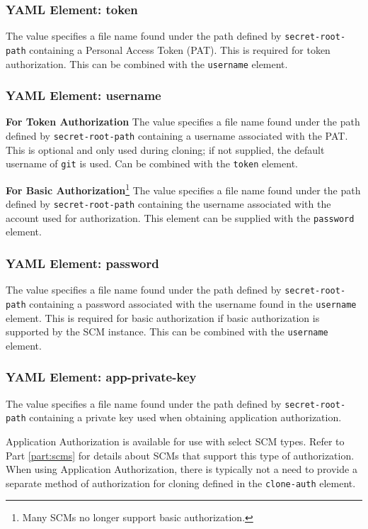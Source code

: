 \subsubsection{YAML Element: token}\label{sec:yaml-api-auth-token}
The value specifies a file name found under the path defined by \texttt{secret-root-path} 
containing a Personal Access Token (PAT).  This is required for token authorization.  This can
be combined with the \texttt{username} element.


\subsubsection{YAML Element: username}\label{sec:yaml-api-auth-username}

\textbf{For Token Authorization}
The value specifies a file name found under the path defined by \texttt{secret-root-path} containing a username associated with the PAT.
This is optional and only used during cloning; if not supplied, the default username of \texttt{git} is used. Can be combined with 
the \texttt{token} element.


\textbf{For Basic Authorization}\footnote{Many SCMs no longer support basic authorization.}
The value specifies a file name found under the path defined by \texttt{secret-root-path} containing the username associated with the account used
for authorization.  This element can be supplied with the \texttt{password} element.

\subsubsection{YAML Element: password}\label{sec:yaml-api-auth-password}
The value specifies a file name found under the path defined by \texttt{secret-root-path} 
containing a password associated with the username found in the \texttt{username} element.  
This is required for basic authorization if basic authorization is supported by the SCM instance.
This can be combined with the \texttt{username} element.


\subsubsection{YAML Element: app-private-key}\label{sec:yaml-api-auth-app-private-key}
The value specifies a file name found under the path defined by \texttt{secret-root-path}
containing a private key used when obtaining application authorization.

Application Authorization is available for use with select SCM types. Refer to Part \ref{part:scms} for details about SCMs
that support this type of authorization. When using Application Authorization, there is typically not a need to provide a separate 
method of authorization for cloning defined in the \texttt{clone-auth} element. 


